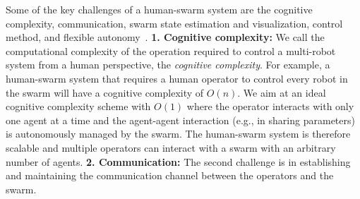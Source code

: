 \documentclass[runningheads]{llncs}%
\begin{document}
Some of the key challenges of a human-swarm system are the cognitive complexity, {communication}, {swarm state estimation} and {visualization}, {control method}, and flexible autonomy~\cite{kolling2015human}.
\textbf{1. Cognitive complexity:} We call the computational complexity of the operation required to control a multi-robot system from a human perspective, the \textit{{cognitive complexity}}. For example, a human-swarm system that requires a human operator to control every robot in the swarm will have a cognitive complexity of $O(n)$. We aim at an ideal cognitive complexity scheme with $O(1)$ where the operator interacts with only one agent at a time and the agent-agent interaction (e.g., in sharing parameters) is autonomously managed by the swarm. The human-swarm system is therefore scalable and multiple operators can interact with a swarm with an arbitrary number of agents. 
\textbf{2. Communication: }
The second challenge is in establishing and maintaining the {communication} channel between the operators and the swarm. 
\end{document}
